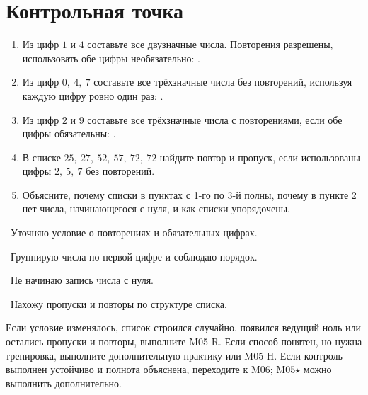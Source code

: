 \newpage
\section{Контрольная точка}

\begin{checkpointbox}
  \begin{enumerate}[label=\textbf{\arabic*.}]
    \item Из цифр \(1\) и \(4\) составьте все двузначные числа. Повторения
      разрешены, использовать обе цифры необязательно:
      \answerblank[70mm].
    \item Из цифр \(0,\ 4,\ 7\) составьте все трёхзначные числа без повторений,
      используя каждую цифру ровно один раз:
      \answerblank[82mm].
    \item Из цифр \(2\) и \(9\) составьте все трёхзначные числа с повторениями,
      если обе цифры обязательны:
      \answerblank[92mm].
    \item В списке \(25,\ 27,\ 52,\ 57,\ 72,\ 72\) найдите повтор и пропуск,
      если использованы цифры \(2,\ 5,\ 7\) без повторений.
    \item Объясните, почему списки в пунктах с 1-го по 3-й полны, почему в пункте 2 нет
      числа, начинающегося с нуля, и как списки упорядочены.
  \end{enumerate}
\end{checkpointbox}

\begin{reflectionbox}
  \choicebox\ Уточняю условие о повторениях и обязательных цифрах.

  \choicebox\ Группирую числа по первой цифре и соблюдаю порядок.

  \choicebox\ Не начинаю запись числа с нуля.

  \choicebox\ Нахожу пропуски и повторы по структуре списка.
\end{reflectionbox}

\begin{notebox}
  Если условие изменялось, список строился случайно, появился ведущий ноль
  или остались пропуски и повторы, выполните M05-R. Если способ понятен, но
  нужна тренировка, выполните дополнительную практику или M05-H. Если
  контроль выполнен устойчиво и полнота объяснена, переходите к M06;
  M05\(\star\) можно выполнить дополнительно.
\end{notebox}
